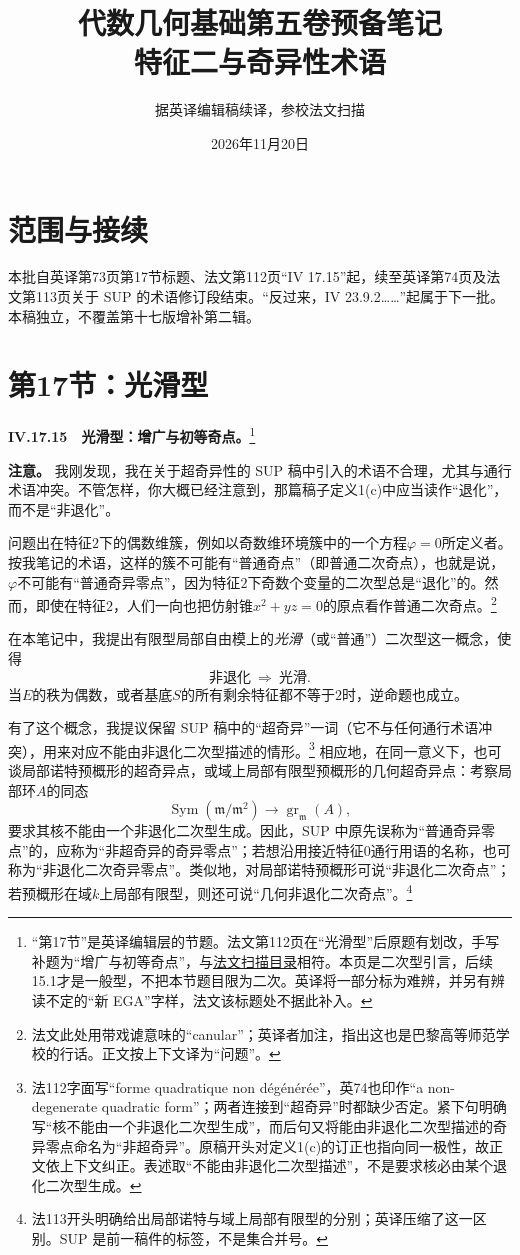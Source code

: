 \documentclass[openany,fontset=fandol]{ctexbook}
\newcommand{\mm}{\mathfrak m}
\begin{document}
\title{代数几何基础第五卷预备笔记\\特征二与奇异性术语}
\author{据英译编辑稿续译，参校法文扫描}
\date{2026年11月20日}
\maketitle
\chapter*{范围与接续}
本批自英译第73页第17节标题、法文第112页“IV 17.15”起，续至英译第74页及法文第113页关于 SUP 的术语修订段结束。“反过来，IV 23.9.2……”起属于下一批。本稿独立，不覆盖第十七版增补第二辑。
\chapter*{第17节：光滑型}
\noindent\textbf{IV.17.15　光滑型：增广与初等奇点。}\footnote{“第17节”是英译编辑层的节题。法文第112页在“光滑型”后原题有划改，手写补题为“增广与初等奇点”，与\href{https://webusers.imj-prg.fr/~leila.schneps/grothendieckcircle/EGA/EGAVcontents.pdf}{法文扫描目录}相符。本页是二次型引言，后续15.1才是一般型，不把本节题目限为二次。英译将一部分标为难辨，并另有辨读不定的“新 EGA”字样，法文该标题处不据此补入。}

\medskip
\noindent\textbf{注意。} 我刚发现，我在关于超奇异性的 SUP 稿中引入的术语不合理，尤其与通行术语冲突。不管怎样，你大概已经注意到，那篇稿子定义1(c)中应当读作“退化”，而不是“非退化”。

问题出在特征$2$下的偶数维簇，例如以奇数维环境簇中的一个方程$\varphi=0$所定义者。按我笔记的术语，这样的簇不可能有“普通奇点”（即普通二次奇点），也就是说，$\varphi$不可能有“普通奇异零点”，因为特征$2$下奇数个变量的二次型总是“退化”的。然而，即使在特征$2$，人们一向也把仿射锥$x^2+yz=0$的原点看作普通二次奇点。\footnote{法文此处用带戏谑意味的“canular”；英译者加注，指出这也是巴黎高等师范学校的行话。正文按上下文译为“问题”。}

在本笔记中，我提出有限型局部自由模上的\emph{光滑}（或“普通”）二次型这一概念，使得
\[
\text{非退化}\ \Longrightarrow\ \text{光滑}.
\]
当$E$的秩为偶数，或者基底$S$的所有剩余特征都不等于$2$时，逆命题也成立。

有了这个概念，我提议保留 SUP 稿中的“超奇异”一词（它不与任何通行术语冲突），用来对应不能由非退化二次型描述的情形。\footnote{法112字面写“forme quadratique non dégénérée”，英74也印作“a non-degenerate quadratic form”；两者连接到“超奇异”时都缺少否定。紧下句明确写“核不能由一个非退化二次型生成”，而后句又将能由非退化二次型描述的奇异零点命名为“非超奇异”。原稿开头对定义1(c)的订正也指向同一极性，故正文依上下文纠正。表述取“不能由非退化二次型描述”，不是要求核必由某个退化二次型生成。}
相应地，在同一意义下，也可谈局部诺特预概形的超奇异点，或域上局部有限型预概形的几何超奇异点：考察局部环$A$的同态
\[
\operatorname{Sym}(\mm/\mm^2)\longrightarrow
\operatorname{gr}_{\mm}(A),
\]
要求其核不能由一个非退化二次型生成。因此，SUP 中原先误称为“普通奇异零点”的，应称为“非超奇异的奇异零点”；若想沿用接近特征$0$通行用语的名称，也可称为“非退化二次奇异零点”。类似地，对局部诺特预概形可说“非退化二次奇点”；若预概形在域$k$上局部有限型，则还可说“几何非退化二次奇点”。\footnote{法113开头明确给出局部诺特与域上局部有限型的分别；英译压缩了这一区别。SUP 是前一稿件的标签，不是集合并号。}
\end{document}
